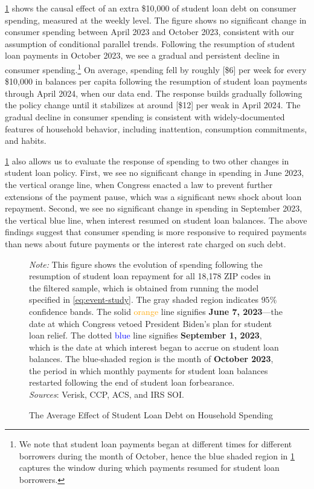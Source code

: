 \documentclass[12pt]{article}
\begin{document}
\cref{fig:agg-spending} shows the causal effect of an extra \$10,000 of student loan debt on consumer spending, measured at the weekly level. The figure shows no significant change in consumer spending between April 2023 and October 2023, consistent with our assumption of conditional parallel trends. Following the resumption of student loan payments in October 2023, we see a gradual and persistent decline in consumer spending.\footnote{We note that student loan payments began at different times for different borrowers during the month of October, hence the blue shaded region in \cref{fig:agg-spending} captures the window during which payments resumed for student loan borrowers.} 
On average, spending fell by roughly [\$6] per week for every \$10,000 in balances per capita following the resumption of student loan payments through April 2024, when our data end. The response builds gradually following the policy change until it stabilizes at around [\$12] per weak in April 2024. The gradual decline in consumer spending is consistent with widely-documented features of household behavior, including inattention, consumption commitments, and habits. 

\cref{fig:agg-spending} also allows us to evaluate the response of spending to two other changes in student loan policy. First, we see no significant change in spending in June 2023, the vertical orange line, when Congress enacted a law to prevent further extensions of the payment pause, which was a significant news shock about loan repayment. Second, we see no significant change in spending in September 2023, the vertical blue line, when interest resumed on student loan balances. The above findings suggest that consumer spending is more responsive to required payments than news about future payments or the interest rate charged on such debt. 

\begin{figure}[!ht]
    \centering
    \caption{The Average Effect of Student Loan Debt on Household Spending}
    \resizebox{\linewidth}{!}
    {
    
    }
    \label{fig:agg-spending}

    \raggedright     \footnotesize{
    \emph{Note:} This figure shows the evolution of spending following the resumption of student loan repayment for all 18,178 ZIP codes in the filtered sample, which is obtained from running the model specified in \cref{eq:event-study}. The gray shaded region indicates $95\%$ confidence bands. The solid \textcolor{orange}{orange} line signifies \textbf{June 7, 2023}---the date at which Congress vetoed President Biden's plan for student loan relief. The dotted \textcolor{blue}{blue} line signifies \textbf{September 1, 2023}, which is the date at which interest began to accrue on student loan balances. The blue-shaded region is the month of \textbf{October 2023}, the period in which monthly payments for student loan balances restarted following the end of student loan forbearance.
	\\
	\textit{Sources}: Verisk, CCP, ACS, and IRS SOI.
	}
\end{figure}
\end{document}
